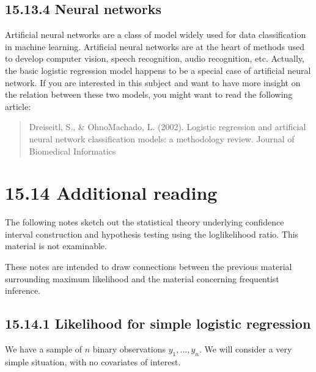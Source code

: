 \documentclass[letterpaper,10pt,english]{jupyterBook}
\begin{document}
\subsection{15.13.4 Neural networks}
\label{\detokenize{15.l. Logistic Regression:neural-networks}}
\sphinxAtStartPar
Artificial neural networks are a class of model widely used for data classification in machine learning. Artificial neural networks are at the heart of  methods used to develop computer vision, speech recognition, audio recognition, etc. Actually, the basic logistic regression model happens to be a special case of artificial neural network. If you are interested in this subject and want to have more insight on the relation between these two models, you might want to read the following article:
\begin{quote}

\sphinxAtStartPar
Dreiseitl, S., \& Ohno\sphinxhyphen{}Machado, L. (2002). Logistic regression and artificial neural network classification models: a methodology review. Journal of Biomedical Informatics
\end{quote}


\section{15.14 Additional reading}
\label{\detokenize{15.m. Logistic Regression:additional-reading}}\label{\detokenize{15.m. Logistic Regression::doc}}
\sphinxAtStartPar
The following notes sketch out the statistical theory underlying confidence interval construction and hypothesis testing using the log\sphinxhyphen{}likelihood ratio. This material is not examinable.

\sphinxAtStartPar
These notes are intended to draw connections between the previous material surrounding maximum likelihood and the material concerning frequentist inference.


\subsection{15.14.1 Likelihood for simple logistic regression}
\label{\detokenize{15.m. Logistic Regression:likelihood-for-simple-logistic-regression}}
\sphinxAtStartPar
{} We have a sample of \(n\) binary observations \(y_1, ..., y_n\). We will consider a very simple situation, with no covariates of interest.
\end{document}
